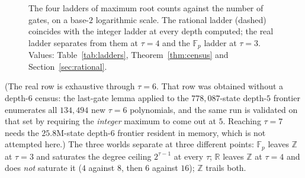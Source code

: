 \documentclass[11pt]{article}
\theoremstyle{definition}
\theoremstyle{remark}
\begin{document}
\begin{figure}[t]
\centering
{}
\caption{The four ladders of maximum root counts against the number of gates, on a base-$2$
logarithmic scale. The rational ladder (dashed) coincides with the integer ladder at every
depth computed; the real ladder separates from them at $\tau = 4$ and the $\mathbb{F}_p$
ladder at $\tau = 3$. Values: Table~\ref{tab:ladders}, Theorem~\ref{thm:census} and
Section~\ref{sec:rational}.}
\label{fig:ladders}
\end{figure}

(The real row is exhaustive through $\tau = 6$. That row was obtained without a
depth-$6$ census: the last-gate lemma applied to the $778{,}087$-state depth-$5$
frontier enumerates all $134{,}494$ new $\tau = 6$ polynomials, and the same run is
validated on that set by requiring the \emph{integer} maximum to come out at $5$.
Reaching $\tau = 7$ needs the $25.8$M-state depth-$6$ frontier resident in memory,
which is not attempted here.) The three worlds separate at
three different points: $\mathbb{F}_p$ leaves $\mathbb{Z}$ at $\tau = 3$ and
saturates the degree ceiling $2^{\tau-1}$ at every $\tau$; $\mathbb{R}$ leaves
$\mathbb{Z}$ at $\tau = 4$ and does \emph{not} saturate it ($4$ against $8$,
then $6$ against $16$); $\mathbb{Z}$ trails both.
\end{document}
